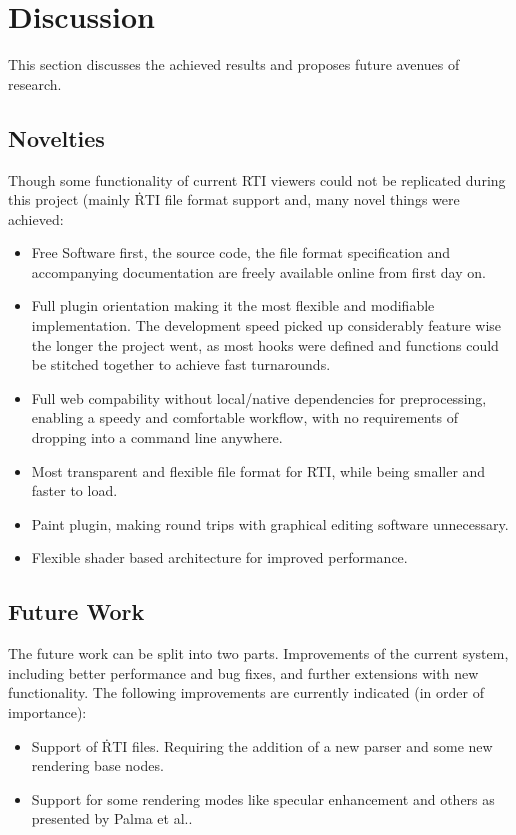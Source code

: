 \section{Discussion}
This section discusses the achieved results and proposes future avenues of research.

\subsection{Novelties}
Though some functionality of current RTI viewers could not be replicated during
this project (mainly \.RTI file format support and, many novel things were
achieved:
\begin{itemize}
\item Free Software first, the source code\cite*{noauthor_oxrti:_2018}, the
  file format specification and accompanying
  documentation\cite*{noauthor_oxrti_thesis_2018} are freely available online from
  first day on.
\item Full plugin orientation making it the most flexible and modifiable
  implementation. The development speed picked up considerably feature wise the
  longer the project went, as most hooks were defined and functions could be
  stitched together to achieve fast turnarounds.
\item Full web compability without local/native dependencies for preprocessing,
  enabling a speedy and comfortable workflow, with no requirements of dropping
  into a command line anywhere.
\item Most transparent and flexible file format for RTI, while being smaller and
  faster to load.
\item Paint plugin, making round trips with graphical editing software
  unnecessary.
\item Flexible shader based architecture for improved performance.
\end{itemize}

\subsection{Future Work}\label{sec_future}
The future work can be split into two parts. Improvements of the current system,
including better performance and bug fixes, and further extensions with new
functionality. The following improvements are currently indicated (in order of importance):
\begin{itemize}
\item Support of \.RTI files. Requiring the addition of a new parser and some
  new rendering base nodes.
\item Support for some rendering modes like specular enhancement and others as
  presented by Palma et al.\cite*{palma_dynamic_2010}.
\end{itemize}

